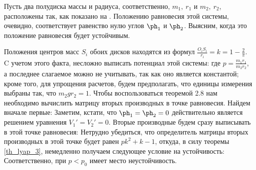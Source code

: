 Пусть два полудиска массы и радиуса, соответственно, $m_1,\ r_1$ и
$m_2,\ r_2$, расположены так, как показано на .
Положению равновесия этой системы, очевидно, соответствует равенство
нулю углов $\ph_1$ и $\ph_2$. Выясним, когда это положение
равновесия будет устойчивым.

Положения центров масс $S_i$ обоих дисков находятся из формул
$\frac{O_iS_i}{r_i}=k=1-\frac{2}{\pi}.$ C учетом этого факта, несложно выписать потенциал этой
системы:
 где
$p=\frac{m_1r_1}{m_2r_2}$, а последнее слагаемое можно не учитывать, так как оно является
константой; кроме того, для упрощения расчетов, будем предполагать, что единицы измерения выбраны
так, что $m_2gr_2=1.$ Чтобы воспользоваться теоремой 2.8 нам необходимо вычислить матрицу вторых
производных в точке равновесия. Найдем вначале первые:
 Заметим, кстати, что
$\ph_1=\ph_2=0$ действительно является решением уравнения $V_1'=V_2'=0$. Вторые производные будем
сразу выписывать в этой точке равновесия:  Нетрудно убедиться, что
определитель матрицы вторых производных в этой точке будет равен $pk^2+k-1$, откуда, в силу теоремы
\ref{th_lyap_3}, немедленно получаем следующее условие на устойчивость:
\equ{p>p_0=\frac{1-k}{k^2}=\frac{2\pi}{(\pi-2)^2}.} Соответственно, при $p<p_0$ имеет место
неустойчивость.
